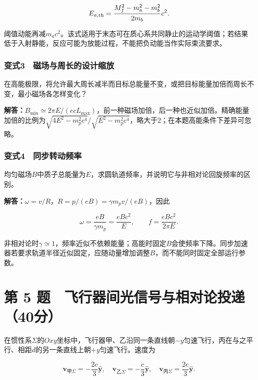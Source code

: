 \documentclass[12pt,a4paper,fontset=fandol]{ctexart}
\begin{document}
\[
E_{a,\rm th}
=\frac{M_f^2-m_a^2-m_b^2}{2m_b}c^2.
\]

阈值动能再减\(m_ac^2\)。该式适用于末态可在质心系共同静止的运动学阈值；若结果低于入射静能，反应可能为放能过程，不能把负动能当作实际束流要求。

\subsubsection{变式3　磁场与周长的设计缩放}\label{ux53d8ux5f0f3-ux78c1ux573aux4e0eux5468ux957fux7684ux8bbeux8ba1ux7f29ux653e}

在高能极限，将允许最大周长减半而目标总能量不变，或把目标能量加倍而周长不变，最小磁场各怎样变化？

\textbf{解答：}\(B_{\min}\simeq2\pi E/(ecL_{\max})\)，前一种磁场加倍，后一种也近似加倍。精确能量加倍的比例为\(\sqrt{4E^2-m_p^2c^4}/\sqrt{E^2-m_p^2c^4}\)，略大于2；在本题高能条件下差异可忽略。

\subsubsection{变式4　同步转动频率}\label{ux53d8ux5f0f4-ux540cux6b65ux8f6cux52a8ux9891ux7387}

均匀磁场\(B\)中质子总能量为\(E\)，求圆轨道频率，并说明它与非相对论回旋频率的区别。

\textbf{解答：}\(\omega=v/R\)，\(R=p/(eB)=\gamma m_pv/(eB)\)，因此

\[
\omega=\frac{eB}{\gamma m_p}
=\frac{eBc^2}{E},\qquad
f=\frac{eBc^2}{2\pi E}.
\]

非相对论时\(\gamma\simeq1\)，频率近似不依赖能量；高能时固定\(B\)会使频率下降。同步加速器若要求轨道半径近似固定，应随动量增加调整\(B\)，而不能同时固定全部运行参数。

\clearpage

\section{第 5
题　飞行器间光信号与相对论投递（40分）}\label{ux7b2c-5-ux9898-ux98deux884cux5668ux95f4ux5149ux4fe1ux53f7ux4e0eux76f8ux5bf9ux8bbaux6295ux901240ux5206}

在惯性系\(\Sigma\)的\(Oxy\)坐标中，飞行器甲、乙沿同一条直线朝\(-y\)匀速飞行，丙在与之平行、相距\(d\)的另一条直线上朝\(+y\)匀速飞行。速度为

\[
\mathbf v_{\text{甲}\Sigma}=-\frac{2c}{3}\hat{\mathbf y},
\quad
\mathbf v_{\text{乙}\Sigma}=-\frac c3\hat{\mathbf y},
\quad
\mathbf v_{\text{丙}\Sigma}=\frac{2c}{3}\hat{\mathbf y}.
\]
\end{document}
